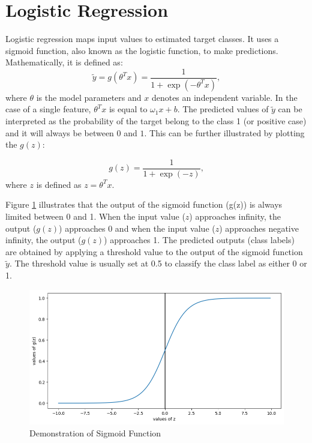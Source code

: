 \newpage

\section{Logistic Regression}

Logistic regression maps input values to estimated target classes. It uses a sigmoid function, also known as the logistic function, to make predictions. Mathematically, it is defined as:
\begin{equation}\label{eq:ypredLR}
   \tilde{y} = g(\theta^T x) = \frac{1}{1+\exp(-\theta^T x)},
\end{equation}where $\theta$ is the model parameters and $x$ denotes an independent variable. In the case of a single feature, $\theta^T x$ is equal to $\omega_1 x + b$. The predicted values of $\tilde{y}$ can be interpreted as the probability of the target belong to the class 1 (or positive case) and it will always be between $0$ and $1$. This can be further illustrated by plotting the $g(z)$:

\begin{equation}\label{eq:ypredLR_z}
   g(z) = \frac{1}{1+\exp(-z)},
\end{equation} where $z$ is defined as $z = \theta^T x$.

Figure \ref{fig:sigmoid} illustrates that the output of the sigmoid function (g(z)) is always limited between 0 and 1. When the input value ($z$) approaches infinity, the output ($g(z)$) approaches 0 and when the input value ($z$) approaches negative infinity, the output ($g(z)$) approaches 1.  The predicted outputs (class labels) are obtained by applying a threshold value to the output of the sigmoid function $\tilde{y}$. The threshold value is usually set at 0.5 to classify the class label as either 0 or 1.

\begin{figure}[!h]
  \centering
  \includegraphics[width=8 cm]{demo_LR.png}
  \caption{Demonstration of Sigmoid Function}
  \label{fig:sigmoid}
\end{figure}

